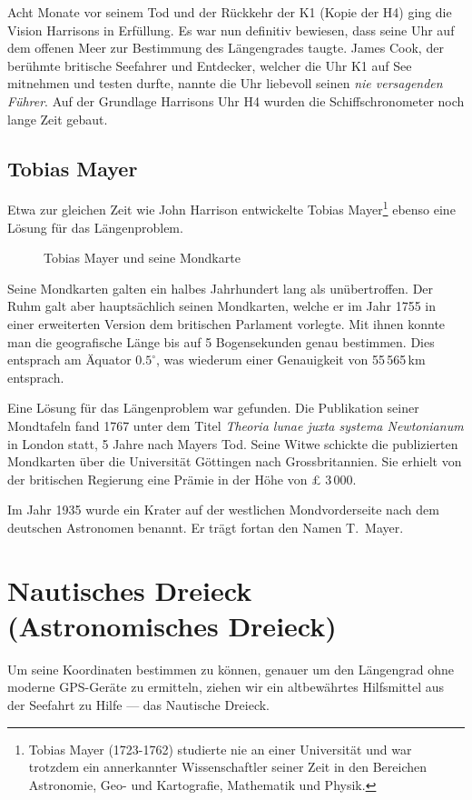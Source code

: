 \begin{refsection}
Acht Monate vor seinem Tod und der Rückkehr der K1 (Kopie der H4)
ging die Vision Harrisons in Erfüllung. Es war nun definitiv bewiesen,
dass seine Uhr auf dem offenen Meer zur Bestimmung des Längengrades
taugte. James Cook, der berühmte britische Seefahrer und Entdecker,
welcher die Uhr K1 auf See mitnehmen und testen durfte, nannte die
Uhr liebevoll seinen {\em nie versagenden Führer}.
%
Auf der Grundlage Harrisons Uhr H4 wurden die Schiffschronometer
noch lange Zeit gebaut.



\subsection{Tobias Mayer}
%
Etwa zur gleichen Zeit wie John Harrison entwickelte Tobias
Mayer\footnote{%
Tobias Mayer (1723-1762) studierte nie an einer Universität und war
trotzdem ein annerkannter Wissenschaftler seiner Zeit in den Bereichen
Astronomie, Geo- und Kartografie, Mathematik und Physik.}
ebenso eine Lösung für das Längenproblem.

\begin{figure}[!htb]
\centering
\quad \quad
\centering
\caption{Tobias Mayer und seine Mondkarte} 
\end{figure}

Seine Mondkarten galten ein halbes Jahrhundert lang als unübertroffen.
Der Ruhm galt aber hauptsächlich seinen Mondkarten, welche er im
Jahr 1755 in einer erweiterten Version dem britischen Parlament
vorlegte.
Mit ihnen konnte man die geografische Länge bis auf 5 Bogensekunden
genau bestimmen. Dies entsprach am Äquator $0.5 ^{\circ}$, was
wiederum einer Genauigkeit von 55\,565\,km entsprach.

Eine Lösung für das Längenproblem war gefunden. Die Publikation
seiner Mondtafeln fand 1767 unter dem Titel {\em Theoria lunae juxta
systema Newtonianum} in London statt, 5 Jahre nach Mayers Tod.
Seine Witwe schickte die publizierten Mondkarten über die Universität
Göttingen nach Grossbritannien. Sie erhielt von der britischen
Regierung eine Prämie in der Höhe von £ 3\,000.

Im Jahr 1935 wurde ein Krater auf der westlichen Mondvorderseite
nach dem deutschen Astronomen benannt. Er trägt fortan den Namen
T.~Mayer.

\section{Nautisches Dreieck (Astronomisches Dreieck)}
Um seine Koordinaten bestimmen zu können, genauer um den Längengrad
ohne moderne GPS-Geräte zu ermitteln, ziehen wir ein altbewährtes
Hilfsmittel aus der Seefahrt zu Hilfe --- das Nautische Dreieck.


\end{refsection}
